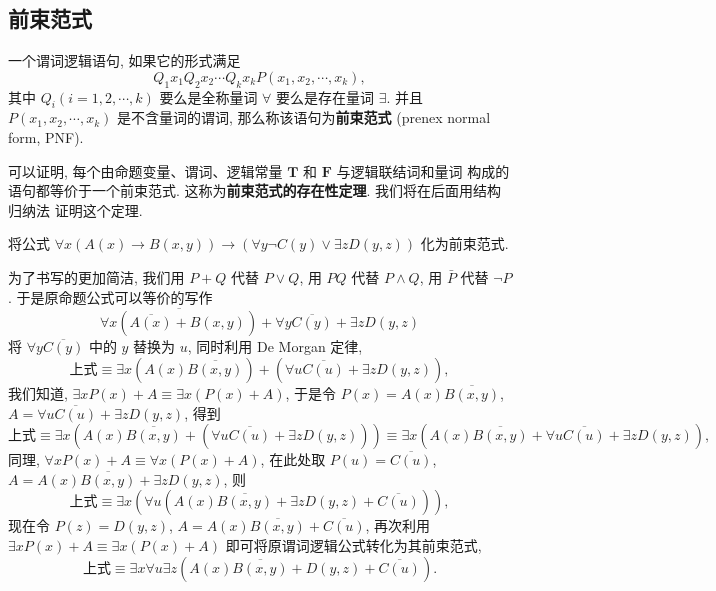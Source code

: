 \documentclass[10pt,UTF8]{book} %
\begin{document}
\subsection{前束范式}

\begin{definition}
    一个谓词逻辑语句, 如果它的形式满足
    \[ Q_1 x_1 Q_2 x_2 \cdots Q_k x_k P(x_1, x_2, \cdots, x_k), \]
    其中 $Q_i (i=1,2,\cdots, k)$ 要么是全称量词 $\forall$ 要么是存在量词 $\exists$. 并且
    $P(x_1, x_2, \cdots, x_k)$ 是不含量词的谓词, 那么称该语句为\textbf{前束范式}
    (prenex normal form, PNF).
\end{definition}

可以证明, 每个由命题变量、谓词、逻辑常量 $\mathbf{T}$ 和 $\mathbf{F}$ 与逻辑联结词和量词
构成的语句都等价于一个前束范式. 这称为\textbf{前束范式的存在性定理}. 我们将在后面用结构归纳法
证明这个定理.

\begin{example}
    将公式 $\forall x \left(
        A(x) \to B(x,y)
    \right) \to \left(\forall y \lnot C(y) \vee \exists z D(y,z)\right)$
    化为前束范式.
    \begin{sol}
        为了书写的更加简洁, 我们用 $P+Q$ 代替 $P \vee Q$, 用 $PQ$ 代替 $P \wedge Q$,
        用 $\bar P$ 代替 $\lnot P$.
        于是原命题公式可以等价的写作
        \[ \overline{\forall x \left( \overline{A(x)} + B(x,y) \right)}
        + \forall y \overline{C(y)} + \exists z D(y,z) \]
        将 $\forall y \overline{C(y)}$ 中的 $y$ 替换为 $u$, 同时利用 De Morgan 定律,
        \[ \text{上式} \equiv \exists x \left(
            A(x)\overline{B(x,y)}
        \right) + \left(\forall u \overline{C(u)} + \exists z D(y,z)\right), \]
        我们知道, $\exists x P(x) + A \equiv \exists x \left(
            P(x) + A
        \right)$, 于是令 $P(x) = A(x)\overline{B(x,y)}$, $A = \forall u \overline{C(u)} + \exists z D(y,z)$,
        得到 \[
            \text{上式} \equiv \exists x \left(
                A(x)\overline{B(x,y)}+ \left(
                    \forall u \overline{C(u)} + \exists z D(y,z)
                \right)
            \right) \equiv \exists x \left(
                A(x)\overline{B(x,y)}+ \forall u \overline{C(u)} + \exists z D(y,z)
            \right), \]
        同理, $\forall x P(x) + A \equiv \forall x \left(
            P(x) + A
        \right)$, 在此处取 $P(u) = \overline{C(u)}$, $A = A(x)\overline{B(x,y)} + \exists z D(y,z)$,
        则 \[ \text{上式} \equiv \exists x \left(
        \forall u \left( A(x)\overline{B(x,y)} + \exists z D(y,z) + \overline{C(u)} \right)
        \right), \]
        现在令 $P(z) = D(y,z)$, $A = A(x)\overline{B(x,y)} + \overline{C(u)}$,
        再次利用 $\exists x P(x) + A \equiv \exists x \left(
            P(x) + A
        \right)$ 即可将原谓词逻辑公式转化为其前束范式,
        \[ \text{上式} \equiv \exists x \forall u \exists z \left(
            A(x)\overline{B(x,y)} +  D(y,z) + \overline{C(u)}
        \right). \]
    \end{sol}
\end{example}
\end{document}
